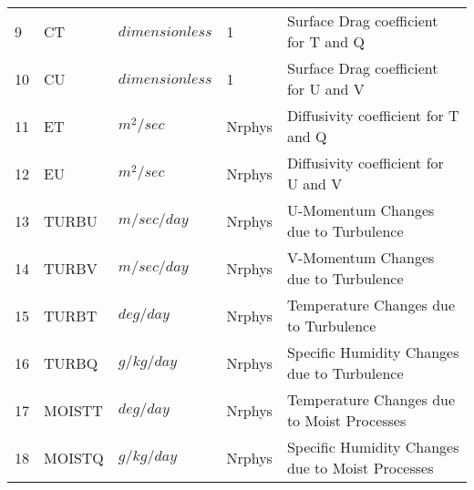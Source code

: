 \begin{tabular}{lllll}
9 & CT       &  $dimensionless$ &  1 
         &\begin{minipage}[t]{3in}
          {Surface Drag coefficient for T and Q}
         \end{minipage}\\
10 & CU       & $dimensionless$ &  1 
         &\begin{minipage}[t]{3in}
          {Surface Drag coefficient for U and V}
         \end{minipage}\\
11 & ET       &  $m^2/sec$ &  Nrphys
         &\begin{minipage}[t]{3in}
          {Diffusivity coefficient for T and Q}
         \end{minipage}\\
12 & EU       &  $m^2/sec$ &  Nrphys
         &\begin{minipage}[t]{3in}
          {Diffusivity coefficient for U and V}
         \end{minipage}\\
13 & TURBU    &  $m/sec/day$ &  Nrphys 
         &\begin{minipage}[t]{3in}
          {U-Momentum Changes due to Turbulence}
         \end{minipage}\\
14 & TURBV    &  $m/sec/day$ &  Nrphys 
         &\begin{minipage}[t]{3in}
          {V-Momentum Changes due to Turbulence}
         \end{minipage}\\
15 & TURBT    &  $deg/day$ &  Nrphys 
         &\begin{minipage}[t]{3in}
          {Temperature Changes due to Turbulence}
         \end{minipage}\\
16 & TURBQ    &  $g/kg/day$ &  Nrphys 
         &\begin{minipage}[t]{3in}
          {Specific Humidity Changes due to Turbulence}
         \end{minipage}\\
17 & MOISTT   &   $deg/day$ &  Nrphys 
         &\begin{minipage}[t]{3in}
          {Temperature Changes due to Moist Processes}
         \end{minipage}\\
18 & MOISTQ   &  $g/kg/day$ &  Nrphys 
         &\begin{minipage}[t]{3in}
          {Specific Humidity Changes due to Moist Processes}

\end{minipage}
\end{tabular}

